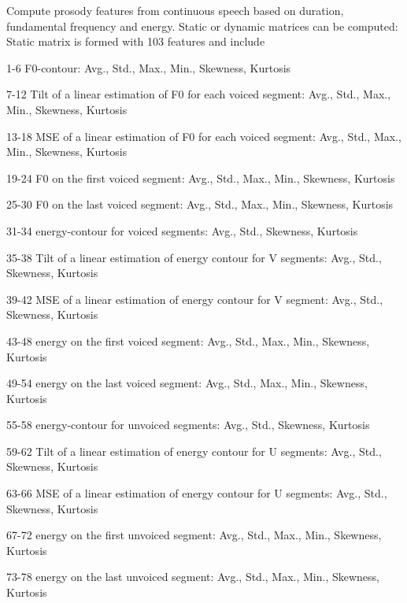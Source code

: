 \documentclass[letterpaper,10pt,english]{sphinxmanual}
\begin{document}
\begin{fulllineitems}
\label{\detokenize{Prosody:prosody.Prosody}}
Compute prosody features from continuous speech based on duration, fundamental frequency and energy.
Static or dynamic matrices can be computed:
Static matrix is formed with 103 features and include

1-6     F0-contour:                                                       Avg., Std., Max., Min., Skewness, Kurtosis

7-12    Tilt of a linear estimation of F0 for each voiced segment:        Avg., Std., Max., Min., Skewness, Kurtosis

13-18   MSE of a linear estimation of F0 for each voiced segment:         Avg., Std., Max., Min., Skewness, Kurtosis

19-24   F0 on the first voiced segment:                                   Avg., Std., Max., Min., Skewness, Kurtosis

25-30   F0 on the last voiced segment:                                    Avg., Std., Max., Min., Skewness, Kurtosis

31-34   energy-contour for voiced segments:                               Avg., Std., Skewness, Kurtosis

35-38   Tilt of a linear estimation of energy contour for V segments:     Avg., Std., Skewness, Kurtosis

39-42   MSE of a linear estimation of energy contour for V segment:       Avg., Std., Skewness, Kurtosis

43-48   energy on the first voiced segment:                               Avg., Std., Max., Min., Skewness, Kurtosis

49-54   energy on the last voiced segment:                                Avg., Std., Max., Min., Skewness, Kurtosis

55-58   energy-contour for unvoiced segments:                             Avg., Std., Skewness, Kurtosis

59-62   Tilt of a linear estimation of energy contour for U segments:     Avg., Std., Skewness, Kurtosis

63-66   MSE of a linear estimation of energy contour for U segments:      Avg., Std., Skewness, Kurtosis

67-72   energy on the first unvoiced segment:                             Avg., Std., Max., Min., Skewness, Kurtosis

73-78   energy on the last unvoiced segment:                              Avg., Std., Max., Min., Skewness, Kurtosis


\end{fulllineitems}
\end{document}

